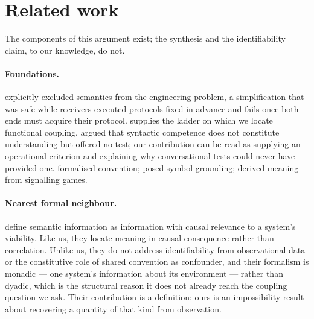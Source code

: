 \documentclass[11pt,a4paper]{article}
\theoremstyle{plain}
\theoremstyle{definition}
\theoremstyle{remark}
\begin{document}
\section{Related work}\label{sec:related}

The components of this argument exist; the synthesis and the identifiability claim, to our knowledge, do not.

\paragraph{Foundations.}
\citet{shannon1948mathematical} explicitly excluded semantics from the engineering problem, a simplification
that was safe while receivers executed protocols fixed in advance and fails once both ends must acquire their
protocol. \citet{pearl2009causality} supplies the ladder on which we locate functional coupling.
\citet{searle1980minds} argued that syntactic competence does not constitute understanding but offered no
test; our contribution can be read as supplying an operational criterion and explaining why conversational
tests could never have provided one. \citet{lewis1969convention} formalised convention;
\citet{harnad1990symbol} posed symbol grounding; \citet{skyrms2010signals} derived meaning from signalling
games.

\paragraph{Nearest formal neighbour.}
\citet{kolchinsky2018semantic} define semantic information as information with causal relevance to a system's
viability. Like us, they locate meaning in causal consequence rather than correlation. Unlike us, they do not
address identifiability from observational data or the constitutive role of shared convention as confounder,
and their formalism is monadic --- one system's information about its environment --- rather than dyadic,
which is the structural reason it does not already reach the coupling question we ask. Their contribution is a
definition; ours is an impossibility result about recovering a quantity of that kind from observation.
\end{document}
